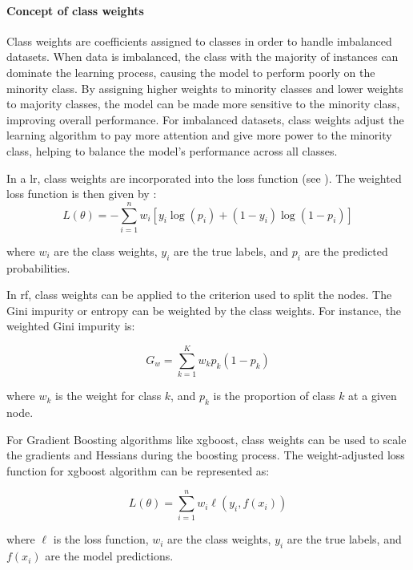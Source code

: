 \documentclass[12pt]{article}
\begin{document}
\paragraph{Concept of class weights}

\noindent Class weights are coefficients assigned to classes in order to handle imbalanced datasets. When data is imbalanced, the class with the majority of instances can dominate the learning process, causing the model to perform poorly on the minority class. By assigning higher weights to minority classes and lower weights to majority classes, the model can be made more sensitive to the minority class, improving overall performance. For imbalanced datasets, class weights adjust the learning algorithm to pay more attention and give more power to the minority class, helping to balance the model's performance across all classes.
 
\noindent In a \acrlong{lr}, class weights are incorporated into the loss function (see \cite{AppliedMachineLearning}). The weighted loss function is then given by :
\begin{equation}
L(\theta) = -\sum_{i=1}^{n} w_i \left[ y_i \log(p_i) + (1 - y_i) \log(1 - p_i) \right]
\end{equation}
 
where \( w_i \) are the class weights, \( y_i \) are the true labels, and \( p_i \) are the predicted probabilities.
 
In \acrlong{rf}, class weights can be applied to the criterion used to split the nodes. The Gini impurity or entropy can be weighted by the class weights. For instance, the weighted Gini impurity is:

\begin{equation}
G_w = \sum_{k=1}^{K} w_k p_k (1 - p_k)
\end{equation}
 
where \( w_k \) is the weight for class \( k \), and \( p_k \) is the proportion of class \( k \) at a given node.
 
For Gradient Boosting algorithms like \acrshort{xgboost}, class weights can be used to scale the gradients and Hessians during the boosting process. The weight-adjusted loss function for \acrshort{xgboost} algorithm can be represented as:
 
\begin{equation}
L(\theta) = \sum_{i=1}^{n} w_i \ell(y_i, f(x_i))
\end{equation}
 
where \( \ell \) is the loss function, \( w_i \) are the class weights, \( y_i \) are the true labels, and \( f(x_i) \) are the model predictions.
\end{document}

